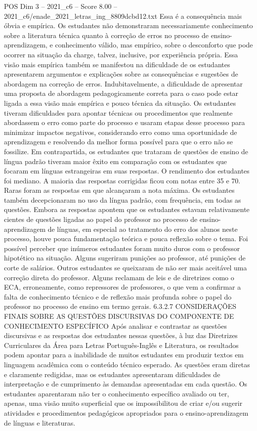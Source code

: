 \begin{textsample}{POS Dim 3 – 2021\_c6 – Score 8.00 – 2021\_c6/enade\_2021\_letras\_ing\_8809dcbd12.txt}
Essa é a consequência mais óbvia e empírica.
Os estudantes não demonstraram necessariamente conhecimento sobre a literatura técnica quanto à correção de erros no processo de ensino-aprendizagem, e conhecimento válido, mas empírico, sobre o desconforto que pode ocorrer na situação da charge, talvez, inclusive, por experiência própria.
Essa visão mais empírica também se manifestou na dificuldade de os estudantes apresentarem argumentos e explicações sobre as consequências e sugestões de abordagem na correção de erros.
Indubitavelmente, a dificuldade de apresentar uma proposta de abordagem pedagogicamente correta para o caso pode estar ligada a essa visão mais empírica e pouco técnica da situação.
Os estudantes tiveram dificuldades para apontar técnicas ou procedimentos que realmente abordassem o erro como parte do processo e usaram etapas desse processo para minimizar impactos negativos, considerando erro como uma oportunidade de aprendizagem e resolvendo da melhor forma possível para que o erro não se fossilize.
Em contrapartida, os estudantes que trataram de questões de ensino de língua padrão tiveram maior êxito em comparação com os estudantes que focaram em línguas estrangeiras em suas respostas.
O rendimento dos estudantes foi mediano.
A maioria das respostas corrigidas ficou com notas entre 35 e 70.
Raras foram as respostas em que alcançaram a nota máxima.
Os estudantes também decepcionaram no uso da língua padrão, com frequência, em todas as questões.
Embora as respostas apontem que os estudantes estavam relativamente cientes de questões ligadas ao papel do professor no processo de ensino-aprendizagem de línguas, em especial ao tratamento do erro dos alunos neste processo, houve pouca fundamentação teórica e pouca reflexão sobre o tema.
Foi possível perceber que inúmeros estudantes foram muito duros com o professor hipotético na situação.
Alguns sugeriram punições ao professor, até punições de corte de salários.
Outros estudantes se queixaram de não ser mais aceitável uma correção direta do professor.
Alguns reclamam de leis e de diretrizes como o ECA, erroneamente, como repressores de professores, o que vem a confirmar a falta de conhecimento técnico e de reflexão mais profunda sobre o papel do professor no processo de ensino em termo gerais. 6.3.2.7 CONSIDERAÇÕES FINAIS SOBRE AS QUESTÕES DISCURSIVAS DO COMPONENTE DE CONHECIMENTO ESPECÍFICO Após analisar e contrastar as questões discursivas e as respostas dos estudantes nessas questões, à luz das Diretrizes Curriculares da Área para Letras Português-Inglês e Literatura, os resultados podem apontar para a inabilidade de muitos estudantes em produzir textos em linguagem acadêmica com o conteúdo técnico esperado.
As questões eram diretas e claramente redigidas, mas os estudantes apresentaram dificuldades de interpretação e de cumprimento às demandas apresentadas em cada questão.
Os estudantes aparentaram não ter o conhecimento específico avaliado ou ter, apenas, uma visão muito superficial que os impossibilitou de criar e/ou sugerir atividades e procedimentos pedagógicos apropriados para o ensino-aprendizagem de línguas e literaturas.

\end{textsample}
